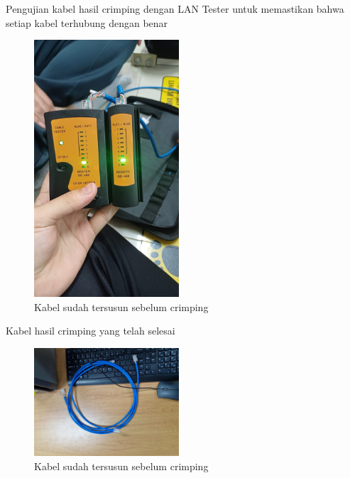 \newpage
Pengujian kabel hasil crimping dengan LAN Tester untuk memastikan bahwa setiap kabel terhubung dengan benar

\begin{figure}[H]
    \centering
    \includegraphics[width=0.48\textwidth]{P1/img/lantester.jpg}
    \caption{Kabel sudah tersusun sebelum crimping}
    \label{fig:crimping2_lampiran}
\end{figure}

Kabel hasil crimping yang telah selesai

\begin{figure}[H]
    \centering
    \includegraphics[width=0.48\textwidth]{P1/img/hasilcrimping.jpg}
    \caption{Kabel sudah tersusun sebelum crimping}
    \label{fig:crimping2_lampiran}
\end{figure}
